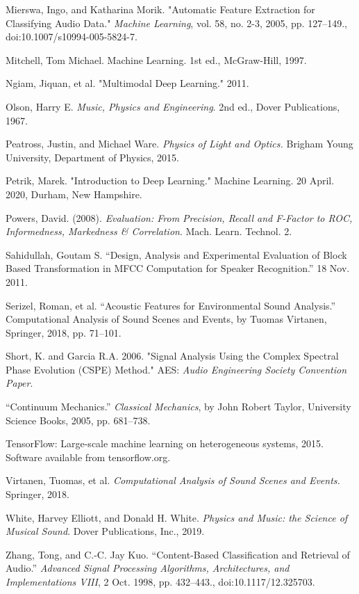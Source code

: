 \documentclass[12pt,letterpaper]{article}
\begin{document}
\begin{thebibliography}{9}
Mierswa, Ingo, and Katharina Morik. "Automatic Feature Extraction for Classifying Audio Data." \textit{Machine Learning}, vol. 58, no. 2-3, 2005, pp. 127–149., doi:10.1007/s10994-005-5824-7.

Mitchell, Tom Michael. Machine Learning. 1st ed., McGraw-Hill, 1997.

Ngiam, Jiquan, et al. "Multimodal Deep Learning." 2011. 

Olson, Harry E. \textit{Music, Physics and Engineering}. 2nd ed., Dover Publications, 1967.

Peatross, Justin, and Michael Ware. \textit{Physics of Light and Optics.} Brigham Young University, Department of Physics, 2015.

Petrik, Marek. "Introduction to Deep Learning." Machine Learning. 20 April. 2020, Durham, New Hampshire.

Powers, David. (2008). \textit{Evaluation: From Precision, Recall and F-Factor to ROC, Informedness, Markedness \& Correlation}. Mach. Learn. Technol. 2. 

Sahidullah, Goutam S. “Design, Analysis and Experimental Evaluation of Block Based Transformation in MFCC Computation for Speaker Recognition.” 18 Nov. 2011. 

Serizel, Roman, et al. “Acoustic Features for Environmental Sound Analysis.” Computational Analysis of Sound Scenes and Events, by Tuomas Virtanen, Springer, 2018, pp. 71–101. 

Short, K. and Garcia R.A. 2006. "Signal Analysis Using the Complex Spectral Phase Evolution (CSPE) Method." AES: \textit{Audio Engineering Society Convention Paper}.

“Continuum Mechanics.” \textit{Classical Mechanics}, by John Robert Taylor, University Science Books, 2005, pp. 681–738. 

TensorFlow: Large-scale machine learning on heterogeneous systems,
2015. Software available from tensorflow.org.

Virtanen, Tuomas, et al. \textit{Computational Analysis of Sound Scenes and Events.} Springer, 2018.

White, Harvey Elliott, and Donald H. White. \textit{Physics and Music: the Science of Musical Sound}. Dover Publications, Inc., 2019.

Zhang, Tong, and C.-C. Jay Kuo. “Content-Based Classification and Retrieval of Audio.” \textit{Advanced Signal Processing Algorithms, Architectures, and Implementations VIII}, 2 Oct. 1998, pp. 432–443., doi:10.1117/12.325703.

\end{thebibliography}

\end{document}
